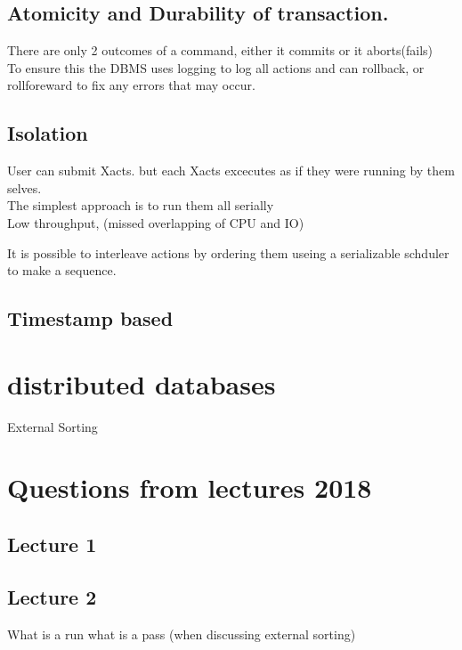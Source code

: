 \documentclass[a4paper,10pt,titlepage]{report}
\begin{document}
\subsection{Atomicity and Durability of transaction.}
There are only 2 outcomes of a command, either it commits or it aborts(fails)\\

To ensure this the DBMS uses logging to log all actions and can rollback, or rollforeward to fix any errors that may occur.

\subsection{Isolation}
User can submit Xacts. but each Xacts excecutes as if they were running by them selves. \\
The simplest approach is to run them all serially\\
\hspace{10mm} Low throughput, (missed overlapping of CPU and IO)

It is possible to interleave actions by ordering them useing a serializable schduler to make a sequence.\\


\subsection{Timestamp based}



\section{distributed databases}




External Sorting 




\newpage

\section{Questions from lectures 2018}

\subsection{Lecture 1}


\subsection{Lecture 2}
What is a run what is a pass (when discussing external sorting)\\
\end{document}
